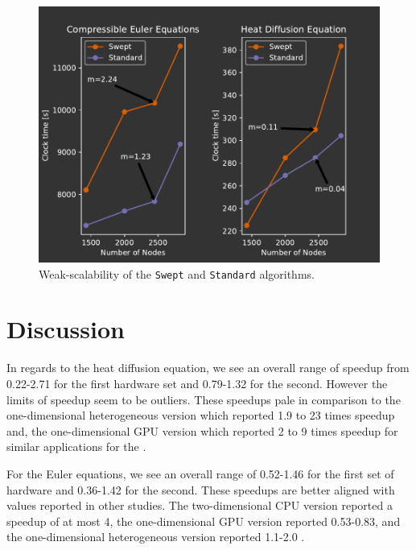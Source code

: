 \documentclass[preprints,article,accept,moreauthors,pdftex]{Definitions/mdpi}
\def\Swept{\texttt{Swept}}
\def\Standard{\texttt{Standard}}
\newcommand\fs{0.7}
\begin{document}
\begin{figure}[H]
    
    \begin{center}
        \includegraphics[scale=\fs, trim={0.1cm 0.25cm 1cm 1cm},clip]{figs/weakScalability.pdf}
        \caption{Weak-scalability of the \Swept{} and \Standard{} algorithms.}
        \label{fig:scalability}
    \end{center}
\end{figure}




\section{Discussion}
\label{discussion-section}
In regards to the heat diffusion equation, we see an overall range of speedup from 0.22-2.71 for the first hardware set and 0.79-1.32 for the second. However the limits of speedup seem to be outliers. These speedups pale in comparison to the one-dimensional heterogeneous version which reported 1.9 to 23 times speedup and, the one-dimensional GPU version which reported 2 to 9 times speedup for similar applications for the  \cite{Magee2018AcceleratingDecomposition,Magee2020ApplyingSystems}. 

For the Euler equations, we see an overall range of 0.52-1.46 for the first set of hardware and 0.36-1.42 for the second. These speedups are better aligned with values reported in other studies. The two-dimensional CPU version reported a speedup of at most 4, the one-dimensional GPU version reported 0.53-0.83, and the one-dimensional heterogeneous version reported 1.1-2.0 \cite{Alhubail2018ThePDEs,Magee2018AcceleratingDecomposition,Magee2020ApplyingSystems}.
\end{document}
